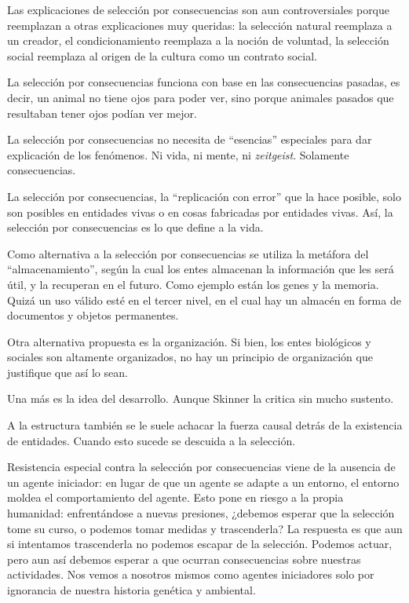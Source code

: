 \documentclass[a4paper,12pt]{article}
\begin{document}
Las explicaciones de selección por consecuencias son aun controversiales porque reemplazan a otras explicaciones muy queridas: la selección natural reemplaza a un creador, el condicionamiento reemplaza a la noción de voluntad, la selección social reemplaza al origen de la cultura como un contrato social.

La selección por consecuencias funciona con base en las consecuencias pasadas, es decir, un animal no tiene ojos para poder ver, sino porque animales pasados que resultaban tener ojos podían ver mejor.

La selección por consecuencias no necesita de ``esencias'' especiales para dar explicación de los fenómenos. Ni vida, ni mente, ni {\itshape zeitgeist}. Solamente consecuencias.

La selección por consecuencias, la ``replicación con error'' que la hace posible, solo son posibles en entidades vivas o en cosas fabricadas por entidades vivas. Así, la selección por consecuencias es lo que define a la vida.

Como alternativa a la selección por consecuencias se utiliza la metáfora del ``almacenamiento'', según la cual los entes almacenan la información que les será útil, y la recuperan en el futuro. Como ejemplo están los genes y la memoria. Quizá un uso válido esté en el tercer nivel, en el cual hay un almacén en forma de documentos y objetos permanentes.

Otra alternativa propuesta es la organización. Si bien, los entes biológicos y sociales son altamente organizados, no hay un principio de organización que justifique que así lo sean.

Una más es la idea del desarrollo. Aunque Skinner la critica sin mucho sustento.

A la estructura también se le suele achacar la fuerza causal detrás de la existencia de entidades. Cuando esto sucede se descuida a la selección.

Resistencia especial contra la selección por consecuencias viene de la ausencia de un agente iniciador: en lugar de que un agente se adapte a un entorno, el entorno moldea el comportamiento del agente. Esto pone en riesgo a la propia humanidad: enfrentándose a nuevas presiones, ¿debemos esperar que la selección tome su curso, o podemos tomar medidas y trascenderla? La respuesta es que aun si intentamos trascenderla no podemos escapar de la selección. Podemos actuar, pero aun así debemos esperar a que ocurran consecuencias sobre nuestras actividades. Nos vemos a nosotros mismos como agentes iniciadores solo por ignorancia de nuestra historia genética y ambiental.
\end{document}
